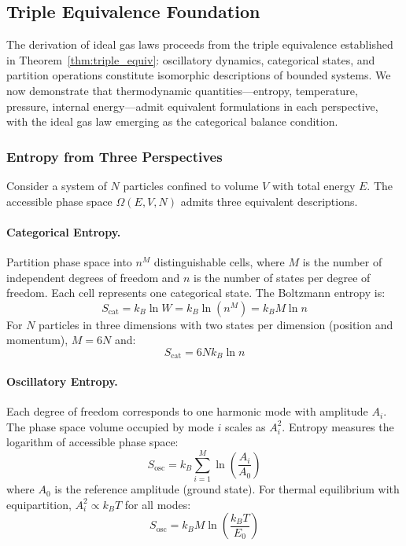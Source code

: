 
\subsection{Triple Equivalence Foundation}

The derivation of ideal gas laws proceeds from the triple equivalence established in Theorem~\ref{thm:triple_equiv}: oscillatory dynamics, categorical states, and partition operations constitute isomorphic descriptions of bounded systems. We now demonstrate that thermodynamic quantities---entropy, temperature, pressure, internal energy---admit equivalent formulations in each perspective, with the ideal gas law emerging as the categorical balance condition.

\subsubsection{Entropy from Three Perspectives}

Consider a system of $N$ particles confined to volume $V$ with total energy $E$. The accessible phase space $\Omega(E,V,N)$ admits three equivalent descriptions.

\paragraph{Categorical Entropy.}
Partition phase space into $n^M$ distinguishable cells, where $M$ is the number of independent degrees of freedom and $n$ is the number of states per degree of freedom. Each cell represents one categorical state. The Boltzmann entropy is:
\begin{equation}
S_{\text{cat}} = k_B \ln W = k_B \ln(n^M) = k_B M \ln n
\label{eq:categorical_entropy}
\end{equation}
For $N$ particles in three dimensions with two states per dimension (position and momentum), $M = 6N$ and:
\begin{equation}
S_{\text{cat}} = 6N k_B \ln n
\end{equation}

\paragraph{Oscillatory Entropy.}
Each degree of freedom corresponds to one harmonic mode with amplitude $A_i$. The phase space volume occupied by mode $i$ scales as $A_i^2$. Entropy measures the logarithm of accessible phase space:
\begin{equation}
S_{\text{osc}} = k_B \sum_{i=1}^{M} \ln\left(\frac{A_i}{A_0}\right)
\label{eq:oscillatory_entropy}
\end{equation}
where $A_0$ is the reference amplitude (ground state). For thermal equilibrium with equipartition, $A_i^2 \propto k_B T$ for all modes:
\begin{equation}
S_{\text{osc}} = k_B M \ln\left(\frac{k_B T}{E_0}\right)
\end{equation}

